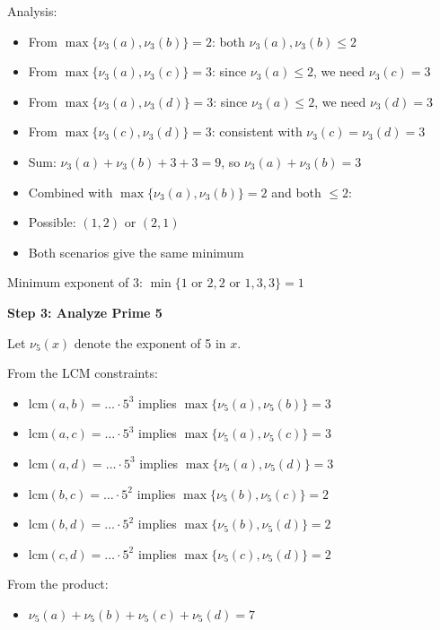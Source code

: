 \documentclass[12pt]{article}
\begin{document}
\begin{techniquesbox}
\begin{itemize}[leftmargin=*]
    Analysis:
    \begin{itemize}
        \item From $\max\{\nu_3(a), \nu_3(b)\} = 2$: both $\nu_3(a), \nu_3(b) \leq 2$
        \item From $\max\{\nu_3(a), \nu_3(c)\} = 3$: since $\nu_3(a) \leq 2$, we need $\nu_3(c) = 3$
        \item From $\max\{\nu_3(a), \nu_3(d)\} = 3$: since $\nu_3(a) \leq 2$, we need $\nu_3(d) = 3$
        \item From $\max\{\nu_3(c), \nu_3(d)\} = 3$: consistent with $\nu_3(c) = \nu_3(d) = 3$
        \item Sum: $\nu_3(a) + \nu_3(b) + 3 + 3 = 9$, so $\nu_3(a) + \nu_3(b) = 3$
        \item Combined with $\max\{\nu_3(a), \nu_3(b)\} = 2$ and both $\leq 2$:
        \item Possible: $(1,2)$ or $(2,1)$
        \item Both scenarios give the same minimum
    \end{itemize}
    
    Minimum exponent of 3: $\min\{1 \text{ or } 2, 2 \text{ or } 1, 3, 3\} = 1$
    
    \textbf{Step 3: Analyze Prime 5}
    
    Let $\nu_5(x)$ denote the exponent of 5 in $x$.
    
    From the LCM constraints:
    \begin{itemize}
        \item $\text{lcm}(a,b) = \ldots \cdot 5^3$ implies $\max\{\nu_5(a), \nu_5(b)\} = 3$
        \item $\text{lcm}(a,c) = \ldots \cdot 5^3$ implies $\max\{\nu_5(a), \nu_5(c)\} = 3$
        \item $\text{lcm}(a,d) = \ldots \cdot 5^3$ implies $\max\{\nu_5(a), \nu_5(d)\} = 3$
        \item $\text{lcm}(b,c) = \ldots \cdot 5^2$ implies $\max\{\nu_5(b), \nu_5(c)\} = 2$
        \item $\text{lcm}(b,d) = \ldots \cdot 5^2$ implies $\max\{\nu_5(b), \nu_5(d)\} = 2$
        \item $\text{lcm}(c,d) = \ldots \cdot 5^2$ implies $\max\{\nu_5(c), \nu_5(d)\} = 2$
    \end{itemize}
    
    From the product:
    \begin{itemize}
        \item $\nu_5(a) + \nu_5(b) + \nu_5(c) + \nu_5(d) = 7$
    \end{itemize}
    

\end{itemize}
\end{techniquesbox}
\end{document}
